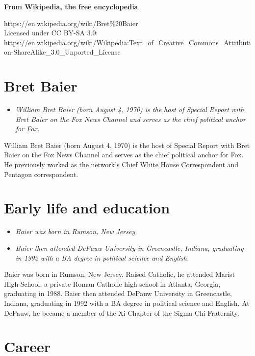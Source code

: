 \textbf{From Wikipedia, the free encyclopedia}

https://en.wikipedia.org/wiki/Bret\%20Baier\\
Licensed under CC BY-SA 3.0:\\
https://en.wikipedia.org/wiki/Wikipedia:Text\_of\_Creative\_Commons\_Attribution-ShareAlike\_3.0\_Unported\_License

\section{Bret Baier}\label{bret-baier}

\begin{itemize}
\item
  \emph{William Bret Baier (born August 4, 1970) is the host of Special
  Report with Bret Baier on the Fox News Channel and serves as the chief
  political anchor for Fox.}
\end{itemize}

William Bret Baier (born August 4, 1970) is the host of Special Report
with Bret Baier on the Fox News Channel and serves as the chief
political anchor for Fox. He previously worked as the network's Chief
White House Correspondent and Pentagon correspondent.

\section{Early life and education}\label{early-life-and-education}

\begin{itemize}
\item
  \emph{Baier was born in Rumson, New Jersey.}
\item
  \emph{Baier then attended DePauw University in Greencastle, Indiana,
  graduating in 1992 with a BA degree in political science and English.}
\end{itemize}

Baier was born in Rumson, New Jersey. Raised Catholic, he attended
Marist High School, a private Roman Catholic high school in Atlanta,
Georgia, graduating in 1988. Baier then attended DePauw University in
Greencastle, Indiana, graduating in 1992 with a BA degree in political
science and English. At DePauw, he became a member of the Xi Chapter of
the Sigma Chi Fraternity.

\section{Career}\label{career}

